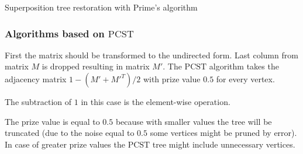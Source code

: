 \documentclass[11pt, tightenlines, twoside, onecolumn, nofloats, nobibnotes, nofootinbib, superscriptaddress, noshowpacks, centertags]{revtex4}
\begin{document}
\begin{algorithm}
    \DontPrintSemicolon
    \caption{Superposition tree restoration with Prime's algorithm\label{alg_rec_prim}}
\end{algorithm}

\subsubsection{Algorithms based on $\text{PCST}$}

First the matrix should be transformed to the undirected form. Last column from matrix $M$ is dropped resulting in matrix $M'$. The $\text{PCST}$ algorithm takes the adjacency matrix $1 - (M' + M'^T) / 2$ with prize value $0.5$ for every vertex.

The subtraction of $1$ in this case is the element-wise operation.

The prize value is equal to $0.5$ because with smaller values the tree will be truncated (due to the noise equal to $0.5$ some vertices might be pruned by error). In case of greater prize values the $\text{PCST}$ tree might include unnecessary vertices.
\end{document}
